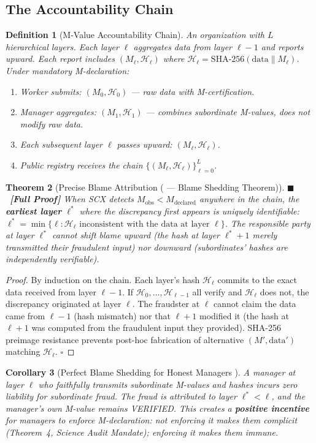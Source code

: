 \documentclass[11pt,a4paper]{article}
\newtheorem{theorem}{Theorem}[section]
\newtheorem{corollary}[theorem]{Corollary}
\newtheorem{definition}[theorem]{Definition}
\theoremstyle{definition}
\newcommand{\rigorFull}[0]{$\blacksquare$~\textbf{[Full Proof]}}
\begin{document}
\subsection{The Accountability Chain}
\begin{definition}[M-Value Accountability Chain]
An organization with $L$ hierarchical layers. Each layer $\ell$ aggregates data from layer $\ell-1$ and reports upward. Each report includes $(M_\ell, \mathcal{H}_\ell)$ where $\mathcal{H}_\ell = \text{SHA-256}(\text{data} \| M_\ell)$. Under mandatory M-declaration:
\begin{enumerate}[label=(\roman*)]
    \item Worker submits: $(M_0, \mathcal{H}_0)$ — raw data with M-certification.
    \item Manager aggregates: $(M_1, \mathcal{H}_1)$ — combines subordinate M-values, does not modify raw data.
    \item Each subsequent layer $\ell$ passes upward: $(M_\ell, \mathcal{H}_\ell)$.
    \item Public registry receives the chain $\{(M_\ell, \mathcal{H}_\ell)\}_{\ell=0}^L$.
\end{enumerate}
\end{definition}
\begin{theorem}[Precise Blame Attribution  ( — Blame Shedding Theorem)]
\label{thm:blame-chain}
\rigorFull
When SCX detects $M_{\text{obs}} < M_{\text{declared}}$ anywhere in the chain, the \textbf{earliest layer} $\ell^*$ where the discrepancy first appears is uniquely identifiable: $\ell^* = \min\{\ell : \mathcal{H}_\ell \text{ inconsistent with the data at layer } \ell\}$. The responsible party at layer $\ell^*$ cannot shift blame upward (the hash at layer $\ell^*+1$ merely transmitted their fraudulent input) nor downward (subordinates' hashes are independently verifiable).
\end{theorem}
\begin{proof}
By induction on the chain. Each layer's hash $\mathcal{H}_\ell$ commits to the exact data received from layer $\ell-1$. If $\mathcal{H}_0, \ldots, \mathcal{H}_{\ell-1}$ all verify and $\mathcal{H}_\ell$ does not, the discrepancy originated at layer $\ell$. The fraudster at $\ell$ cannot claim the data came from $\ell-1$ (hash mismatch) nor that $\ell+1$ modified it (the hash at $\ell+1$ was computed from the fraudulent input they provided). SHA-256 preimage resistance prevents post-hoc fabrication of alternative $(M', \text{data}')$ matching $\mathcal{H}_\ell$. $\square$
\end{proof}
\begin{corollary}[Perfect Blame Shedding for Honest Managers ]
A manager at layer $\ell$ who faithfully transmits subordinate M-values and hashes incurs zero liability for subordinate fraud. The fraud is attributed to layer $\ell^* < \ell$, and the manager's own M-value remains VERIFIED. This creates a \textbf{positive incentive} for managers to enforce M-declaration: not enforcing it makes them complicit (Theorem~4, Science Audit Mandate); enforcing it makes them immune.
\end{corollary}
\end{document}
